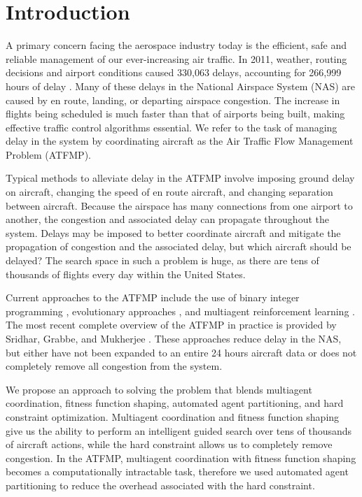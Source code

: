 \documentclass{sig-alternate}
\begin{document}



\vspace{100pt}
\section{Introduction}
A primary concern facing the aerospace industry today is the efficient, safe and reliable management of our ever-increasing air traffic. In 2011, weather, routing decisions and airport conditions caused 330,063 delays, accounting for 266,999 hours of delay \cite{faa05}. Many of these delays in the National Airspace System (NAS) are caused by en route, landing, or departing airspace congestion. The increase in flights being scheduled is much faster than that of airports being built, making effective traffic control algorithms essential. We refer to the task of managing delay in the system by coordinating aircraft as the Air Traffic Flow Management Problem (ATFMP). 

Typical methods to alleviate delay in the ATFMP involve imposing ground delay on aircraft, changing the speed of en route aircraft, and changing separation between aircraft. Because the airspace has many connections from one airport to another, the congestion and associated delay can propagate throughout the system. Delays may be imposed to better coordinate aircraft and mitigate the propagation of congestion and the associated delay, but which aircraft should be delayed? The search space in such a problem is huge, as there are tens of thousands of flights every day within the United States.

Current approaches to the ATFMP include the use of binary integer programming \cite{Bertsimas}, evolutionary approaches \cite{Rios}, and multiagent reinforcement learning \cite{tumer-agogino_jaamas12}. The most recent complete overview of the ATFMP in practice is provided by Sridhar, Grabbe, and Mukherjee \cite{Sridhar}. These approaches reduce delay in the NAS, but either have not been expanded to an entire 24 hours aircraft data or does not completely remove all congestion from the system. 

We propose an approach to solving the problem that blends multiagent coordination, fitness function shaping, automated agent partitioning, and hard constraint optimization. Multiagent coordination and fitness function shaping give us the ability to perform an intelligent guided search over tens of thousands of aircraft actions, while the hard constraint allows us to completely remove congestion. In the ATFMP, multiagent coordination with fitness function shaping becomes a computationally intractable task, therefore we used automated agent partitioning to reduce the overhead associated with the hard constraint. 
\end{document}

